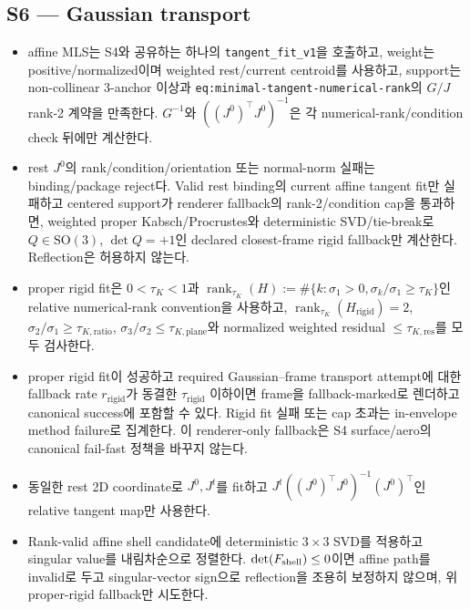 \documentclass[10pt]{article}
\newcommand{\code}[1]{{\small\nolinkurl{#1}}}
\begin{document}
\subsection{S6 --- Gaussian transport}

\begin{itemize}
  \item [\(\square\)] affine MLS는 S4와 공유하는 하나의
  \code{tangent\_fit\_v1}을 호출하고, weight는 positive/normalized이며 weighted
  rest/current centroid를 사용하고, support는 non-collinear 3-anchor 이상과
  \code{eq:minimal-tangent-numerical-rank}의 \(G/J\) rank-2 계약을 만족한다.
  \(G^{-1}\)와 \(((J^0)^\top J^0)^{-1}\)은 각 numerical-rank/condition check 뒤에만 계산한다.
  \item [\(\square\)] rest \(J^0\)의 rank/condition/orientation 또는 normal-norm 실패는
  binding/package reject다. Valid rest binding의 current affine tangent fit만 실패하고 centered support가
  renderer fallback의 rank-2/condition cap을 통과하면, weighted proper Kabsch/Procrustes와
  deterministic SVD/tie-break로 \(Q\in\mathrm{SO}(3)\), \(\det Q=+1\)인
  declared closest-frame rigid fallback만 계산한다. Reflection은 허용하지 않는다.
  \item [\(\square\)] proper rigid fit은
  \(0<\tau_K<1\)과
  \(\operatorname{rank}_{\tau_K}(H):=\#\{k:\sigma_1>0,\sigma_k/\sigma_1\geq\tau_K\}\)인
  relative numerical-rank convention을 사용하고,
  \(\operatorname{rank}_{\tau_K}(H_{\mathrm{rigid}})=2\),
  \(\sigma_2/\sigma_1\geq\tau_{K,\mathrm{ratio}}\),
  \(\sigma_3/\sigma_2\leq\tau_{K,\mathrm{plane}}\)와 normalized weighted residual
  \(\leq\tau_{K,\mathrm{res}}\)를 모두 검사한다.
  \item [\(\square\)] proper rigid fit이 성공하고 required Gaussian--frame transport attempt에 대한
  fallback rate \(r_{\mathrm{rigid}}\)가 동결한 \(\tau_{\mathrm{rigid}}\) 이하이면 frame을
  fallback-marked로 렌더하고 canonical success에 포함할 수 있다. Rigid fit 실패 또는 cap 초과는
  in-envelope method failure로 집계한다.
  이 renderer-only fallback은 S4 surface/aero의 canonical fail-fast 정책을 바꾸지 않는다.
  \item [\(\square\)] 동일한 rest 2D coordinate로 \(J^0,J^t\)를 fit하고
  \(J^t((J^0)^\top J^0)^{-1}(J^0)^\top\)인 relative tangent map만 사용한다.
  \item [\(\square\)] Rank-valid affine shell candidate에 deterministic \(3\times3\) SVD를 적용하고
  singular value를 내림차순으로 정렬한다.
  \(\det(F_{\rm shell})\leq0\)이면 affine path를 invalid로 두고 singular-vector sign으로
  reflection을 조용히 보정하지 않으며, 위 proper-rigid fallback만 시도한다.

\end{itemize}
\end{document}
